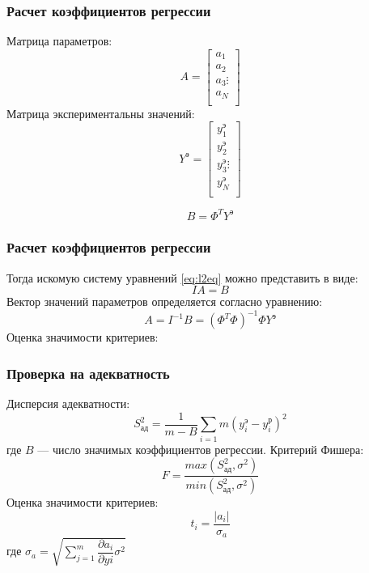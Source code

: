 \begin{frame}
	\frametitle{Расчет коэффициентов регрессии}
	Матрица параметров:
	\begin{equation}
	A = \begin{bmatrix}
	a_1  \\
	a_2 \\
	a_3
	\vdots \\
	a_N \\
	\end{bmatrix}
	\end{equation}
	Матрица экспериментальны значений:
	\begin{equation}
	Y^э = \begin{bmatrix}
	y^э_1  \\
	y^э_2 \\
	y^э_3
	\vdots \\
	y^э_N \\
	\end{bmatrix}
	\end{equation}
	
	\begin{equation}
		B=\Phi^T Y^э
	\end{equation}
\end{frame}

\begin{frame}
	\frametitle{Расчет коэффициентов регрессии}
	Тогда искомую систему уравнений \ref{eq:l2eq} можно представить в виде:
	\begin{equation}
		I A = B
	\end{equation}
	Вектор значений параметров определяется согласно уравнению:
	\begin{equation}
		A =I^{-1} B = (\Phi^T \Phi)^{-1} \Phi Y^э
	\end{equation}
	Оценка значимости критериев:
	
\end{frame}

\begin{frame}
	\frametitle{Проверка на адекватность}
	Дисперсия адекватности:
	\begin{equation}
		S_{ад}^2= \dfrac{1}{m-B}\sum_{i=1}{m}(y_i^э-y_i^р)^2
	\end{equation}
	где $B$ --- число значимых коэффициентов регрессии.
	Критерий Фишера:
	\begin{equation}
		F=\dfrac{max(S_{ад}^2, \sigma^2)}{min(S_{ад}^2, \sigma^2)}
	\end{equation}
	Оценка значимости критериев:
	\begin{equation}
		t_i=\dfrac{|a_i|}{\sigma_a}
	\end{equation}
	где  $\sigma_a =\sqrt{\sum_{j=1}^{m} \dfrac{\partial a_i}{\partial y{i}} \sigma^2}$
\end{frame}

